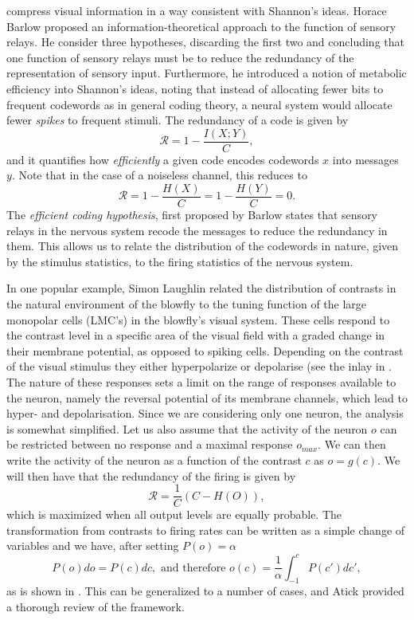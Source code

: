 compress visual information in a way consistent with Shannon's ideas. Horace Barlow proposed an information-theoretical approach to the function of sensory
relays. He consider three hypotheses, discarding the first two and concluding that one function of sensory relays must be to reduce the redundancy of the
representation of sensory input. Furthermore, he introduced a notion of metabolic efficiency into Shannon's ideas, noting that instead of allocating fewer bits to
frequent codewords as in general coding theory, a neural system would allocate fewer \emph{spikes} to frequent stimuli. The redundancy of a code is given by
$$
\mathcal{R} = 1 - \frac{I(X;Y)}{C},
$$
and it quantifies how {\em efficiently} a given code encodes codewords $x$ into messages $y$. Note that in the case of a noiseless channel, this reduces to 
$$
\mathcal{R} = 1 - \frac{H(X)}{C}= 1 - \frac{H(Y)}{C} = 0.
$$
The {\em efficient coding hypothesis}, first proposed by Barlow\cite{Barlow1961} states that sensory relays in the nervous system recode the	messages to reduce the redundancy in them. This allows us to relate the distribution of the codewords in nature, given by the stimulus statistics, to the firing statistics of the nervous system.\par
In one popular example, Simon Laughlin related the distribution of contrasts in the natural environment of the blowfly to the tuning function of the large monopolar 
cells (LMC's) in the blowfly's visual system.\cite{Laughlin1981} These cells respond to the contrast level in a specific area of the visual field with a graded change
in their membrane potential, as opposed to spiking cells. Depending on the contrast of the visual stimulus they either hyperpolarize or depolarise (see the inlay in
. The nature of these responses sets a limit on the range of responses available to the neuron, namely the reversal potential of its membrane
channels, which lead to hyper- and depolarisation.
Since we are considering only one neuron, the analysis is somewhat simplified. Let us also assume that the activity of the neuron $o$ can be restricted between no response and a maximal response $o_{max}$. We can then write the activity of the neuron as a function of the contrast $c$ as $o = g(c)$. We will then have that the redundancy of the firing is given by
$$
\mathcal{R} = \frac{1}{C} \left(C - H(O) \right),
$$
which is maximized when all output levels are equally probable.
The transformation from contrasts to firing rates can be written as a simple change of variables and we have, after setting $P(o) = \alpha$
$$
P(o) do = P(c) dc, \textrm{ and therefore } o(c) = \frac{1}{\alpha} \int_{-1}^c P(c') dc',
$$
as is shown in . This can be generalized to a number of cases, and Atick\cite{Atick1992} provided a thorough review of the framework.\par

